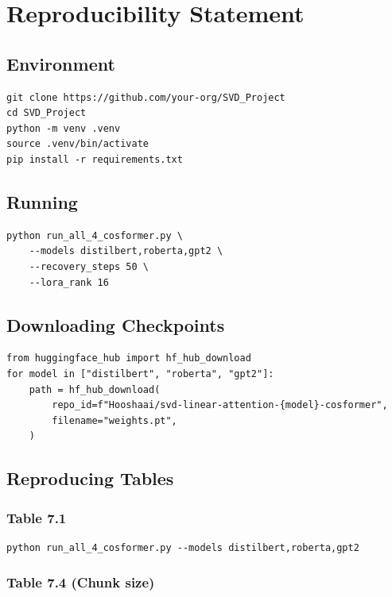 
\section{Reproducibility Statement}

\subsection{Environment}

\begin{lstlisting}
git clone https://github.com/your-org/SVD_Project
cd SVD_Project
python -m venv .venv
source .venv/bin/activate
pip install -r requirements.txt
\end{lstlisting}

\subsection{Running}

\begin{lstlisting}
python run_all_4_cosformer.py \
    --models distilbert,roberta,gpt2 \
    --recovery_steps 50 \
    --lora_rank 16
\end{lstlisting}

\subsection{Downloading Checkpoints}

\begin{lstlisting}
from huggingface_hub import hf_hub_download
for model in ["distilbert", "roberta", "gpt2"]:
    path = hf_hub_download(
        repo_id=f"Hooshaai/svd-linear-attention-{model}-cosformer",
        filename="weights.pt",
    )
\end{lstlisting}

\subsection{Reproducing Tables}

\subsubsection{Table 7.1}

\begin{lstlisting}
python run_all_4_cosformer.py --models distilbert,roberta,gpt2
\end{lstlisting}

\subsubsection{Table 7.4 (Chunk size)}

